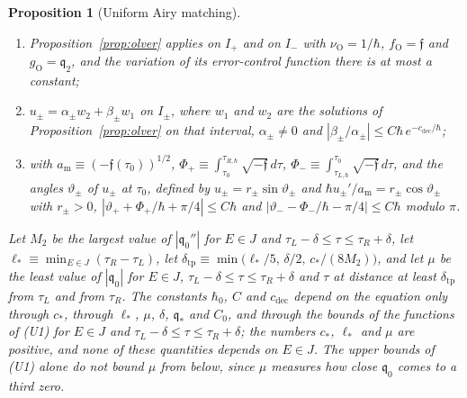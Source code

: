 \documentclass[aps,prd,onecolumn,tightenlines,nofootinbib,notitlepage,11pt,floatfix]{revtex4-2}
\theoremstyle{indentedtheorem}
\newtheorem{proposition}{Proposition}
\begin{document}
\begin{proposition}[Uniform Airy matching]
\begin{enumerate}
\item[(M2)] Proposition~\ref{prop:olver} applies on $I_+$ and on $I_-$ with $\nu_\text{O}=1/\hbar$, $f_\text{O}=\mathfrak{f}$ and $g_\text{O}=\mathfrak{q}_2$, and the variation of its error-control function there is at most a constant;
\item[(M3)] $u_\pm=\alpha_\pm w_2+\beta_\pm w_1$ on $I_\pm$, where $w_1$ and $w_2$ are the solutions of Proposition~\ref{prop:olver} on that interval, $\alpha_\pm\neq0$ and $|\beta_\pm/\alpha_\pm|\leq C\hbar\,e^{-c_\text{dec}/\hbar}$;
\item[(M4)] with $a_\text{m}\equiv(-\mathfrak{f}(\tau_0))^{1/2}$, $\Phi_+\equiv\int_{\tau_0}^{\tau_{R,\hbar}}\sqrt{-\mathfrak{f}}\,d\tau$, $\Phi_-\equiv\int_{\tau_{L,\hbar}}^{\tau_0}\sqrt{-\mathfrak{f}}\,d\tau$, and the angles $\vartheta_\pm$ of $u_\pm$ at $\tau_0$, defined by $u_\pm=r_\pm\sin\vartheta_\pm$ and $\hbar u_\pm'/a_\text{m}=r_\pm\cos\vartheta_\pm$ with $r_\pm>0$, $|\vartheta_++\Phi_+/\hbar+\pi/4|\leq C\hbar$ and $|\vartheta_--\Phi_-/\hbar-\pi/4|\leq C\hbar$ modulo $\pi$.
\end{enumerate}
Let $M_2$ be the largest value of $|\mathfrak{q}_0''|$ for $E\in J$ and $\tau_L-\delta\leq\tau\leq\tau_R+\delta$, let $\ell_*\equiv\min_{E\in J}(\tau_R-\tau_L)$, let $\delta_\text{tp}\equiv\min\big(\ell_*/5,\,\delta/2,\,c_*/(8M_2)\big)$, and let $\mu$ be the least value of $|\mathfrak{q}_0|$ for $E\in J$, $\tau_L-\delta\leq\tau\leq\tau_R+\delta$ and $\tau$ at distance at least $\delta_\text{tp}$ from $\tau_L$ and from $\tau_R$. The constants $\hbar_0$, $C$ and $c_\text{dec}$ depend on the equation only through $c_*$, through $\ell_*$, $\mu$, $\delta$, $\mathfrak{q}_*$ and $C_0$, and through the bounds of the functions of (U1) for $E\in J$ and $\tau_L-\delta\leq\tau\leq\tau_R+\delta$; the numbers $c_*$, $\ell_*$ and $\mu$ are positive, and none of these quantities depends on $E\in J$. The upper bounds of (U1) alone do not bound $\mu$ from below, since $\mu$ measures how close $\mathfrak{q}_0$ comes to a third zero.
\end{proposition}
\end{document}
